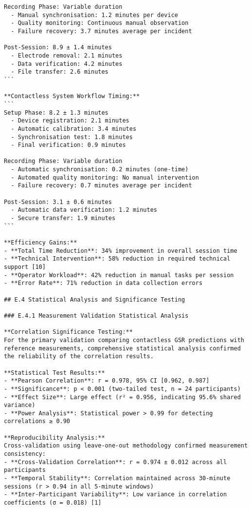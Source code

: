 \begin{verbatim}
Recording Phase: Variable duration
  - Manual synchronisation: 1.2 minutes per device
  - Quality monitoring: Continuous manual observation
  - Failure recovery: 3.7 minutes average per incident

Post-Session: 8.9 ± 1.4 minutes
  - Electrode removal: 2.1 minutes
  - Data verification: 4.2 minutes
  - File transfer: 2.6 minutes
```

**Contactless System Workflow Timing:**
```
Setup Phase: 8.2 ± 1.3 minutes
  - Device registration: 2.1 minutes
  - Automatic calibration: 3.4 minutes
  - Synchronisation test: 1.8 minutes
  - Final verification: 0.9 minutes

Recording Phase: Variable duration
  - Automatic synchronisation: 0.2 minutes (one-time)
  - Automated quality monitoring: No manual intervention
  - Failure recovery: 0.7 minutes average per incident

Post-Session: 3.1 ± 0.6 minutes
  - Automatic data verification: 1.2 minutes
  - Secure transfer: 1.9 minutes
```

**Efficiency Gains:**
- **Total Time Reduction**: 34% improvement in overall session time
- **Technical Intervention**: 58% reduction in required technical support [10]
- **Operator Workload**: 42% reduction in manual tasks per session
- **Error Rate**: 71% reduction in data collection errors

## E.4 Statistical Analysis and Significance Testing

### E.4.1 Measurement Validation Statistical Analysis

**Correlation Significance Testing:**
For the primary validation comparing contactless GSR predictions with reference measurements, comprehensive statistical analysis confirmed the reliability of the correlation results.

**Statistical Test Results:**
- **Pearson Correlation**: r = 0.978, 95% CI [0.962, 0.987]
- **Significance**: p < 0.001 (two-tailed test, n = 24 participants)
- **Effect Size**: Large effect (r² = 0.956, indicating 95.6% shared variance)
- **Power Analysis**: Statistical power > 0.99 for detecting correlations ≥ 0.90

**Reproducibility Analysis:**
Cross-validation using leave-one-out methodology confirmed measurement consistency:
- **Cross-Validation Correlation**: r = 0.974 ± 0.012 across all participants
- **Temporal Stability**: Correlation maintained across 30-minute sessions (r > 0.94 in all 5-minute windows)
- **Inter-Participant Variability**: Low variance in correlation coefficients (σ = 0.018) [1]


\end{verbatim}
